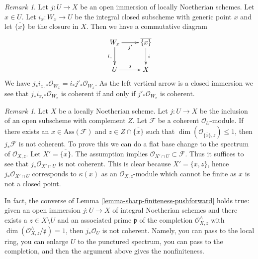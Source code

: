 \documentclass{stacks-project}
\theoremstyle{plain}
\theoremstyle{definition}
\theoremstyle{remark}
\newtheorem{remark}[subsection]{Remark}
\numberwithin{equation}{subsection}
\begin{document}
\begin{remark}
\label{remark-closure}
Let $j : U \to X$ be an open immersion of locally Noetherian schemes.
Let $x \in U$. Let $i_x : W_x \to U$ be the integral closed subscheme
with generic point $x$ and let $\overline{\{x\}}$ be the closure in $X$.
Then we have a commutative diagram
$$
\xymatrix{
W_x \ar[d]_{i_x} \ar[r]_{j'} & \overline{\{x\}} \ar[d]^i \\
U \ar[r]^j & X
}
$$
We have $j_*i_{x, *}\mathcal{O}_{W_x} = i_*j'_*\mathcal{O}_{W_x}$.
As the left vertical arrow is a closed immersion we see that
$j_*i_{x, *}\mathcal{O}_{W_x}$ is coherent if and only if
$j'_*\mathcal{O}_{W_x}$ is coherent.
\end{remark}

\begin{remark}
\label{remark-no-finiteness-pushforward}
Let $X$ be a locally Noetherian scheme. Let $j : U \to X$ be the inclusion of
an open subscheme with complement $Z$. Let $\mathcal{F}$ be a coherent
$\mathcal{O}_U$-module. If there exists an $x \in \text{Ass}(\mathcal{F})$ and
$z \in Z \cap \overline{\{x\}}$ such that
$\dim(\mathcal{O}_{\overline{\{x\}}, z}) \leq 1$, then $j_*\mathcal{F}$ is not
coherent. To prove this we can do a flat base change to the spectrum
of $\mathcal{O}_{X, z}$. Let $X' = \overline{\{x\}}$.
The assumption implies $\mathcal{O}_{X' \cap U} \subset \mathcal{F}$.
Thus it suffices to see that $j_*\mathcal{O}_{X' \cap U}$ is not
coherent. This is clear because $X' = \{x, z\}$, hence
$j_*\mathcal{O}_{X' \cap U}$ corresponds to $\kappa(x)$ as an
$\mathcal{O}_{X, z}$-module which cannot be finite as $x$ is not
a closed point.

\medskip\noindent
In fact, the converse of Lemma \ref{lemma-sharp-finiteness-pushforward}
holds true: given an open immersion $j : U \to X$ of integral Noetherian
schemes and there exists a $z \in X \setminus U$ and an associated prime
$\mathfrak p$ of the completion $\mathcal{O}_{X, z}^\wedge$
with $\dim(\mathcal{O}_{X, z}^\wedge/\mathfrak p) = 1$,
then $j_*\mathcal{O}_U$ is not coherent. Namely, you can pass to
the local ring, you can enlarge $U$ to the punctured spectrum,
you can pass to the completion, and then the argument above gives
the nonfiniteness.
\end{remark}
\end{document}
